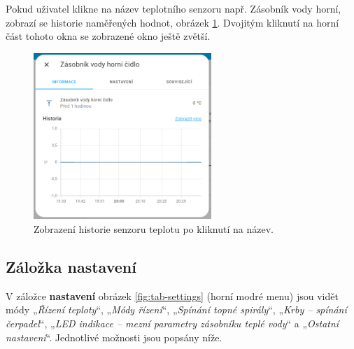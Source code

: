 \begin{Czech}
Pokud uživatel klikne na název teplotního senzoru např. Zásobník vody horní, zobrazí se historie naměřených hodnot, obrázek \ref{fig:click-temperature-sensor}. Dvojitým kliknutí na horní část tohoto okna se zobrazené okno ještě zvětší.
\end{Czech}

\begin{Czech}
\begin{figure}[H]
    \centering
    \includegraphics[width=0.6\textwidth]{pictures/czech/software/click-temperature-sensor.png}
    \caption{Zobrazení historie senzoru teplotu po kliknutí na název.}
    \label{fig:click-temperature-sensor}
\end{figure}
\end{Czech}

\begin{Czech}
\subsection{Záložka nastavení}
\end{Czech}

\begin{Czech}
V záložce \textbf{nastavení} obrázek \ref{fig:tab-settings} (horní modré menu) jsou vidět módy „\textit{Řízení teploty}“, „\textit{Módy řízení}“, „\textit{Spínání topné spirály}“, „\textit{Krby – spínání čerpadel}“, „\textit{LED indikace – mezní parametry zásobníku teplé vody}“ a „\textit{Ostatní nastavení}“. Jednotlivé možnosti jsou popsány níže.
\end{Czech}

